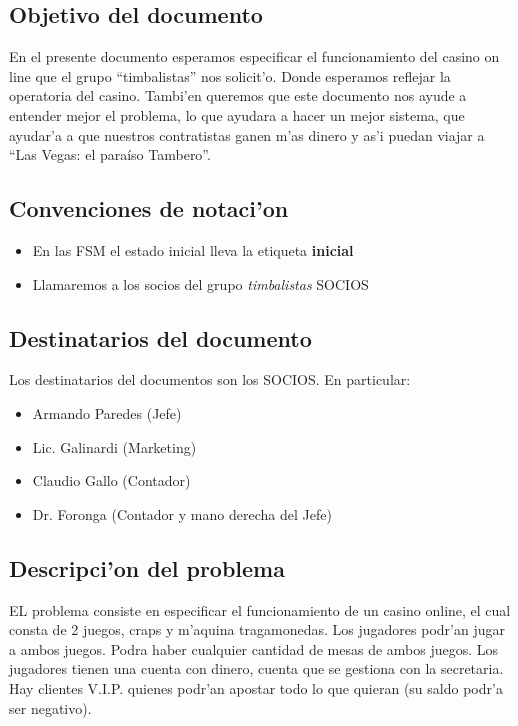 \subsection{ Objetivo del documento	}
En el presente documento esperamos especificar el funcionamiento del casino on line 
que el grupo ``timbalistas'' nos solicit'o.  Donde esperamos reflejar la operatoria
del casino. Tambi'en queremos que este documento nos ayude a entender mejor el problema, 
lo que ayudara a hacer un mejor sistema, que ayudar'a a que nuestros contratistas ganen m'as dinero
y as'i puedan viajar a ``Las Vegas: el paraíso Tambero''.


\subsection{ Convenciones de notaci'on	}
\begin{itemize}
 \item En las FSM el estado inicial lleva la etiqueta \textbf{inicial}
 \item Llamaremos a los socios del grupo \textit{timbalistas} SOCIOS
\end{itemize}


\subsection{ Destinatarios del documento	}
Los destinatarios del documentos son los SOCIOS. En particular:

\begin{itemize}
    \item  Armando Paredes (Jefe)
    \item  Lic. Galinardi (Marketing)
    \item Claudio Gallo (Contador)
    \item  Dr. Foronga (Contador y mano derecha del Jefe)
\end{itemize}


\subsection{ Descripci'on del problema }

EL problema consiste en especificar el funcionamiento de un casino online, el cual consta de 2 juegos,
craps y m'aquina tragamonedas. Los jugadores podr'an jugar a ambos juegos. Podra haber cualquier cantidad 
de mesas de ambos juegos. Los jugadores tienen una cuenta con dinero, cuenta que se gestiona con la secretaria.
Hay clientes V.I.P. quienes podr'an apostar todo lo que quieran (su saldo podr'a ser negativo).



